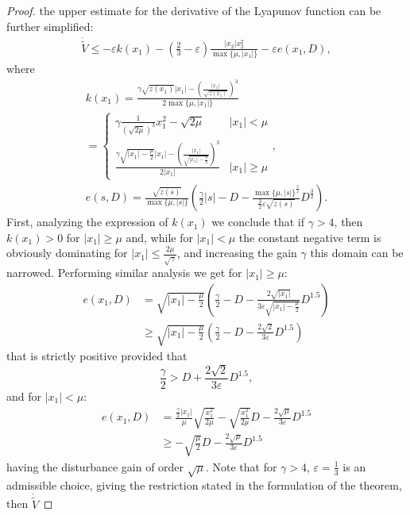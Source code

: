 \documentclass[letterpaper, 10 pt, conference]{ieeeconf}  %
\begin{document}
\begin{proof}
the upper estimate for the derivative of the Lyapunov function can
be further simplified:
\begin{gather*}
\dot{\tilde{V}}\leq-\varepsilon k(x_{1})-\left(\frac{2}{3}-\varepsilon\right)\frac{|x_{2}|x_{2}^{2}}{\max\{\mu,|x_{1}|\}} -\varepsilon e(x_{1},D),
\end{gather*}
where
\begin{gather*}
k(x_{1})=\frac{\gamma\sqrt{z(x_{1})}|x_{1}|-\left(\frac{|x_{1}|}{\sqrt{z(x_{1})}}\right)^{3}}{2\max\{\mu,|x_{1}|\}}\\
=\begin{cases}
\gamma\frac{1}{\left(\sqrt{2\mu}\right)^{3}}x_{1}^{2}-\sqrt{2\mu} & |x_{1}|<\mu\\
\frac{\gamma\sqrt{|x_{1}|-\frac{\mu}{2}}|x_{1}|-\left(\frac{|x_{1}|}{\sqrt{|x_{1}|-\frac{\mu}{2}}}\right)^{3}}{2|x_{1}|} & |x_{1}|\geq\mu
\end{cases},\\
e(s,D)=\frac{\sqrt{z(s)}}{\max\{\mu,|s|\}}\left(\frac{\gamma}{2}|s|-D-\frac{\max\{\mu,|s|\}^{\frac{3}{2}}}{\frac{3}{2}\varepsilon\sqrt{z(s)}}D^{\frac{3}{2}}\right).
\end{gather*}
First, analyzing the expression of $k(x_{1})$ we conclude that if
$\gamma>4$, then $k(x_{1})>0$ for $|x_{1}|\geq\mu$ and, while for
$|x_{1}|<\mu$ the constant negative term is obviously dominating
for $|x_{1}|\leq\frac{2\mu}{\sqrt{\gamma}}$, and increasing the gain
$\gamma$ this domain can be narrowed. Performing similar analysis
we get for $|x_{1}|\geq\mu$:
\begin{align*}
e(x_{1},D) & =\sqrt{|x_{1}|-\frac{\mu}{2}}\left(\frac{\gamma}{2}-D-\frac{2\sqrt{|x_{1}|}}{3\varepsilon\sqrt{|x_{1}|-\frac{\mu}{2}}}D^{1.5}\right)\\
 & \geq\sqrt{|x_{1}|-\frac{\mu}{2}}\left(\frac{\gamma}{2}-D-\frac{2\sqrt{2}}{3\varepsilon}D^{1.5}\right)
\end{align*}
that is strictly positive provided that 
\[
\frac{\gamma}{2}>D+\frac{2\sqrt{2}}{3\varepsilon}D^{1.5},
\]
and for $|x_{1}|<\mu$:
\begin{align*}
e(x_{1},D) & =\frac{\frac{\gamma}{2}|x_{1}|}{\mu}\sqrt{\frac{x_{1}^{2}}{2\mu}}-\sqrt{\frac{x_{1}^{2}}{2\mu}}D-\frac{2\sqrt{\mu}}{3\varepsilon}D^{1.5}\\
 & \geq-\sqrt{\frac{\mu}{2}}D-\frac{2\sqrt{\mu}}{3\varepsilon}D^{1.5}
\end{align*}
having the disturbance gain of order $\sqrt{\mu}$. Note that for
$\gamma>4$, $\varepsilon=\frac{1}{3}$ is an admissible choice, giving
the restriction stated in the formulation of the theorem, then $\dot{\tilde{V}}$

\end{proof}
\end{document}
